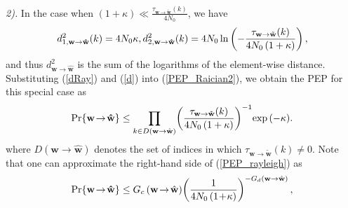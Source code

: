 \documentclass[journal]{IEEEtran}
\begin{document}
\textit{2). } In the case when   $(1+\kappa) \ll \frac{ \tau _{{{\mathbf w}} \rightarrow {\tilde{\mathbf{w}}}}(k)  }{4N_0}$,  we have
  \begin{equation}
   \small
  \label{dRay}
d_{1, \mathbf{w} \to \mathbf{\hat{w}} }^2(k) =4N_0 \kappa, d_{2, \mathbf{w} \to \mathbf{\hat{w}} }^2(k)= 4N_0   \ln \left(- \frac{{  \tau _{{{\mathbf w}} \rightarrow {\tilde{\mathbf{w}}}}(k)  }  }{4N_0 \left( 1+ \kappa\right)}   \right),
    \end{equation}
and thus $d_{ \mathbf{w} \to \mathbf{\hat{w}} }^2$ is the sum of the logarithms of the element-wise distance. 
Substituting (\ref{dRay}) and (\ref{d}) into (\ref{PEP_Raician2}), we obtain the PEP   for this special   case as 
    \begin{equation}
\label{PEP_rayleigh}
 \small
\begin{aligned} 
 \small
\text{Pr} \{\mathbf{w}\! \to \!\mathbf{\hat{w}}\}   \leq 
 {\prod \limits _{k \in D (\mathbf {w}\rightarrow \hat {\mathbf {w}})}  \! \left( \frac{   \tau _{{{\mathbf w}} \rightarrow {\tilde{\mathbf{w}}}}(k)   }{4N_0\left(1+\kappa\right)}  \right)^{-1} \!
 {\exp \left(- \kappa \right) }}. 
\end{aligned}
  \end{equation}
where $ D (\mathbf {w}\rightarrow \hat {\mathbf {w}})$ denotes the     set of  indices in which $ \tau _{{{\mathbf w}} \rightarrow {\tilde{\mathbf{w}}}}(k)   \neq 0$.
Note  that one can approximate the right-hand side of (\ref{PEP_rayleigh})  as  
 \begin{equation}
  \small
 \label{pep_gcgd}
\text{Pr} \{\mathbf{w} \!\to \!\mathbf{\hat{w}}\} \leq
G_{c} \left(\mathbf {w} \! \rightarrow \!\hat{\mathbf {w}} \right) \!
  \left (\frac {1}{ 4N_0 \left(1\!+\! \kappa\right)} \right)^{-{G_{d} (\mathbf {w}\rightarrow \hat {\mathbf {w}})}}, 
 \end{equation}
\end{document}
